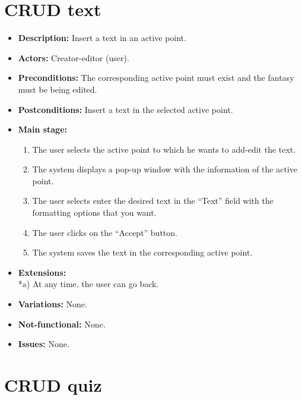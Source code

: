 \section{CRUD text}
\begin{itemize}
	\item \textbf{Description:} Insert a text in an active point.
	\item \textbf{Actors:} Creator-editor (user).
	\item \textbf{Preconditions:} The corresponding active point must exist and the fantasy must be being edited.
	\item \textbf{Postconditions:} Insert a text in the selected active point.
	\item \textbf{Main stage:}
	\begin{enumerate}
		\item The user selects the active point to which he wants to add-edit the text.
		\item The system displays a pop-up window with the information of the active point.
		\item The user selects enter the desired text in the ``Text'' field with the formatting options that you want.
		\item The user clicks on the ``Accept'' button.
		\item The system saves the text in the corresponding active point.
	\end{enumerate}
	\item \textbf{Extensions:} \\ *a) At any time, the user can go back.
	\item \textbf{Variations:} None.
	\item \textbf{Not-functional:} None.
	\item \textbf{Issues:} None.
\end{itemize}

\section{CRUD quiz}
\hypertarget{crearquiz}{}
